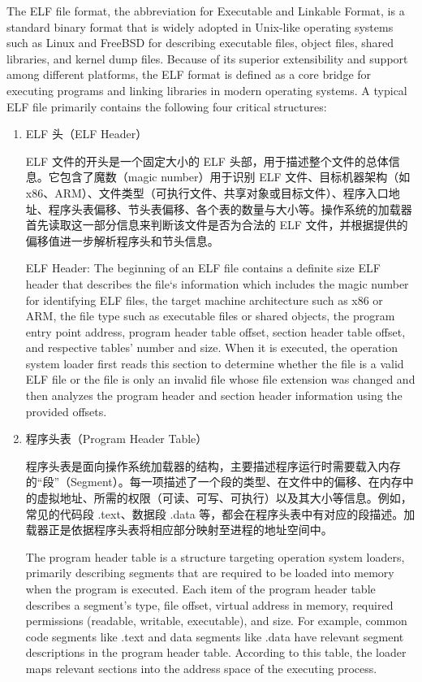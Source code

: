 The ELF file format, the abbreviation for Executable and Linkable Format, is a standard binary format that is widely adopted in Unix-like operating systems such as Linux and FreeBSD for describing executable files, object files, shared libraries, and kernel dump files. Because of its superior extensibility and support among different platforms, the ELF format is defined as a core bridge for executing programs and linking libraries in modern operating systems. A typical ELF file primarily contains the following four critical structures:
\begin{enumerate} [label=\arabic*)] 
\item ELF 头（ELF Header）

ELF 文件的开头是一个固定大小的 ELF 头部，用于描述整个文件的总体信息。它包含了魔数（magic number）用于识别 ELF 文件、目标机器架构（如 x86、ARM）、文件类型（可执行文件、共享对象或目标文件）、程序入口地址、程序头表偏移、节头表偏移、各个表的数量与大小等。操作系统的加载器首先读取这一部分信息来判断该文件是否为合法的 ELF 文件，并根据提供的偏移值进一步解析程序头和节头信息。

ELF Header:
The beginning of an ELF file contains a definite size ELF header that describes the file‘s information which includes the magic number for identifying ELF files, the target machine architecture such as x86 or ARM, the file type such as executable files or shared objects, the program entry point address, program header table offset, section header table offset, and respective tables’ number and size. When it is executed, the operation system loader first reads this section to determine whether the file is a valid ELF file or the file is only an invalid file whose file extension was changed and then analyzes the program header and section header information using the provided offsets.


\item 程序头表（Program Header Table）

程序头表是面向操作系统加载器的结构，主要描述程序运行时需要载入内存的“段”（Segment）。每一项描述了一个段的类型、在文件中的偏移、在内存中的虚拟地址、所需的权限（可读、可写、可执行）以及其大小等信息。例如，常见的代码段 .text、数据段 .data 等，都会在程序头表中有对应的段描述。加载器正是依据程序头表将相应部分映射至进程的地址空间中。

The program header table is a structure targeting operation system loaders, primarily describing segments that are required to be loaded into memory when the program is executed. Each item of the program header table describes a segment's type, file offset, virtual address in memory, required permissions (readable, writable, executable), and size. For example, common code segments like .text and data segments like .data have relevant segment descriptions in the program header table. According to this table, the loader maps relevant sections into the address space of the executing process.


\end{enumerate}
